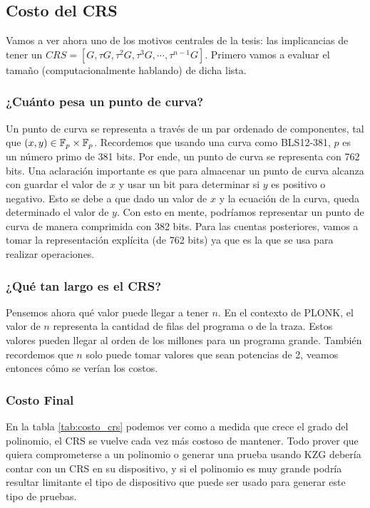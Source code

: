 \subsection{Costo del CRS}
Vamos a ver ahora uno de los motivos centrales de la tesis: las implicancias de tener un $CRS = [G, \tau G, \tau^2 G, \tau^3 G, \cdots, \tau^{n-1}G ]$. Primero vamos a evaluar el tamaño (computacionalmente hablando) de dicha lista.

\subsubsection{¿Cuánto pesa un punto de curva?}

Un punto de curva se representa a través de un par ordenado de componentes, tal que $(x,y)\in \mathbb{F}_p \times \mathbb{F}_p$. Recordemos que usando una curva como BLS12-381, $p$ es un número primo de 381 bits. Por ende, un punto de curva se representa con 762 bits. Una aclaración importante es que para almacenar un punto de curva alcanza con guardar el valor de $x$ y usar un bit para determinar si $y$ es positivo o negativo. Esto se debe a que dado un valor de $x$ y la ecuación de la curva, queda determinado el valor de $y$. Con esto en mente, podríamos representar un punto de curva de manera comprimida con 382 bits. Para las cuentas posteriores, vamos a tomar la representación explícita (de 762 bits) ya que es la que se usa para realizar operaciones. 

\subsubsection{¿Qué tan largo es el CRS?}

Pensemos ahora qué valor puede llegar a tener $n$. En el contexto de PLONK, el valor de $n$ representa la cantidad de filas del programa o de la traza. Estos valores pueden llegar al orden de los millones para un programa grande. También recordemos que $n$ solo puede tomar valores que sean potencias de 2, veamos entonces cómo se verían los costos.

\subsubsection{Costo Final}\label{sec:costo_crs}

En la tabla \ref{tab:costo_crs} podemos ver como a medida que crece el grado del polinomio, el CRS se vuelve cada vez más costoso de mantener. Todo prover que quiera comprometerse a un polinomio o generar una prueba usando KZG debería contar con un CRS en su dispositivo, y si el polinomio es muy grande podría resultar limitante el tipo de dispositivo que puede ser usado para generar este tipo de pruebas. 

